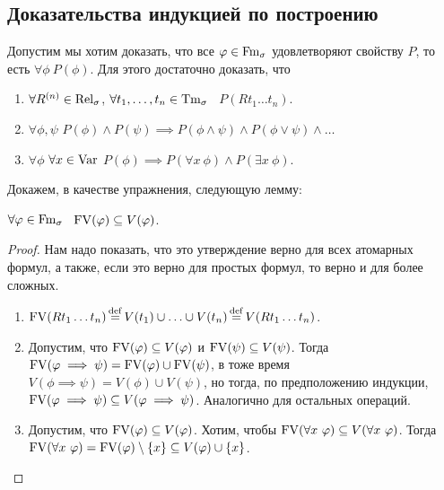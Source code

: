 \subsection{Доказательства индукцией по построению}

Допустим мы хотим доказать, что все $\varphi \in \mathrm{Fm}_{\sigma}$ удовлетворяют свойству $P$, то есть $\forall \phi~P(\phi)$.
Для этого достаточно доказать, что
\begin{enumerate}
    \item $\forall R^{(n)} \in \mathrm{Rel}_{\sigma}$, $\forall t_{1}, \ldots, t_{n} \in \mathrm{Tm}_{\sigma}$ \ $P(R t_{1} \ldots t_{n})$.
    \item $\forall \phi, \psi$ $P(\phi) \land P(\psi) \implies P(\phi \land \psi) \land P(\phi \lor \psi) \land \ldots$
    \item $\forall \phi$ $\forall x \in \mathrm{Var}$ $P(\phi) \implies P(\forall x~ \phi) \land P(\exists x~\phi)$.
\end{enumerate}
Докажем, в качестве упражнения, следующую лемму:
\begin{lemma}
    $\forall \varphi \in \mathrm{Fm}_{\sigma}$ \ $\mathrm{FV}(\varphi) \subseteq V(\varphi)$.
\end{lemma}
\begin{proof}
    Нам надо показать, что это утверждение верно для всех атомарных формул, а также, если это верно для простых формул, то верно и для более сложных.
    \begin{enumerate}
        \item $\mathrm{FV}(R t_{1} \ldots t_{n}) \operatorname{\overset{\mathrm{def}}{=}} V(t_{1}) \cup \ldots \cup V(t_{n}) \operatorname{\overset{\mathrm{def}}{=}} V(R t_{1} \ldots t_{n})$.
        \item Допустим, что $\mathrm{FV}(\varphi) \subseteq V(\varphi)$ и $\mathrm{FV}(\psi) \subseteq V(\psi)$.
        Тогда $\mathrm{FV}(\varphi \implies \psi) = \mathrm{FV}(\varphi) \cup \mathrm{FV}(\psi)$, в тоже время $V(\phi \implies \psi) = V(\phi) \cup V(\psi)$, но тогда, по предположению индукции, $\mathrm{FV}(\varphi \implies \psi) \subseteq V(\varphi \implies \psi)$.
        Аналогично для остальных операций.
        \item Допустим, что $\mathrm{FV}(\varphi) \subseteq V(\varphi)$.
        Хотим, чтобы $\mathrm{FV}(\forall x~\varphi) \subseteq V(\forall x~\varphi)$.
        Тогда $\mathrm{FV}(\forall x~\varphi) = \mathrm{FV}(\varphi) \setminus \{x\} \subseteq V(\varphi) \cup \{x\}$. \qedhere
    \end{enumerate}
\end{proof}

